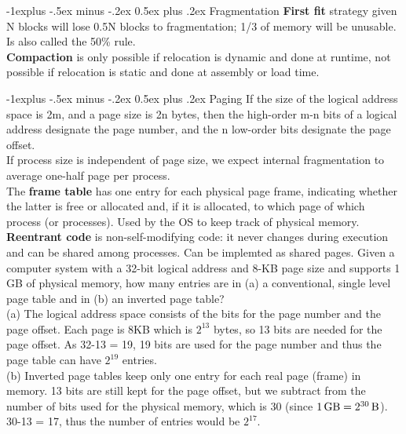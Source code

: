 \documentclass[letterpaper, 8pt]{extarticle}
\makeatletter
\renewcommand{\subsection}{\@startsection{subsection}{2}{0mm}%
                                {-1explus -.5ex minus -.2ex}%
                                {0.5ex plus .2ex}%
                                {\normalfont\small\bfseries}}
\makeatother
\begin{document}
\begin{multicols*}{6}
    \subsection{Fragmentation}
    \textbf{First fit} strategy given N blocks will lose 0.5N blocks to
    fragmentation; 1/3 of memory will be unusable. Is also called the
    50\% rule. \\
    \textbf{Compaction} is only possible if relocation is dynamic and
    done at runtime, not possible if relocation is static and done at
    assembly or load time.

    \subsection{Paging}
    If the size of the logical address space is 2m, and a
    page size is 2n bytes, then the high-order m-n bits of a logical address
    designate the page number, and the n low-order bits designate the page
    offset.\\
    If process size is independent of page size, we expect internal fragmentation
    to average one-half page per process.\\
    The \textbf{frame table} has one entry for each physical page frame,
    indicating whether the latter is free or allocated and, if it is allocated,
    to which page of which process (or processes). Used by the OS to keep
    track of physical memory.\\
    \textbf{Reentrant code} is non-self-modifying code: it
    never changes during execution and can be shared among processes. Can be
    implemted as shared pages.
    Given a computer system with a 32-bit logical address and 8-KB page
    size and supports 1 GB of physical memory, how many entries are in
    (a) a conventional, single level page table and in (b) an inverted
    page table? \\
    (a) The logical address space consists of the bits for the page number
    and the page offset. Each page is 8KB which is $2^{13}$ bytes, so 13 bits
    are needed for the page offset. As 32-13 = 19, 19 bits are used for
    the page number and thus the page table can have $2^{19}$ entries. \\
    (b) Inverted page tables keep only one entry for each real page
    (frame) in memory. 13 bits are still kept for the page offset, but
    we subtract from  the number of bits used for the physical memory,
    which is 30 (since \(\qty{1}{\giga\byte} = \qty[parse-numbers=false]{2^{30}}{\byte}\)).
    30-13 = 17, thus the
    number of entries would be $2^{17}$.

\end{multicols*}
\end{document}
